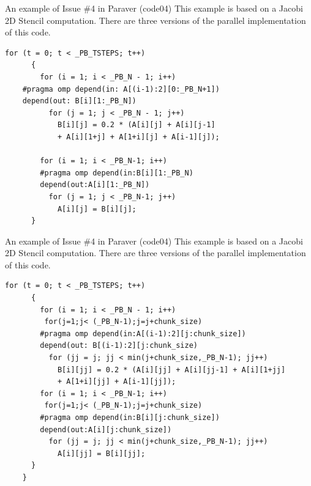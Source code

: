 \documentclass[10pt,xcolor=table]{beamer}
\begin{document}
\begin{frame}[fragile]{An example of Issue \#4 in Paraver (code04)}
This example is based on a Jacobi 2D Stencil computation. There are three versions of the parallel implementation of this code. 
  \begin{lstlisting}[style=shell,gobble=3,basicstyle=\scriptsize\ttfamily,caption={Parallelized with tasks (v1)}]
      for (t = 0; t < _PB_TSTEPS; t++)
      {
        for (i = 1; i < _PB_N - 1; i++)
    #pragma omp depend(in: A[(i-1):2][0:_PB_N+1]) 
    depend(out: B[i][1:_PB_N])   
          for (j = 1; j < _PB_N - 1; j++)
            B[i][j] = 0.2 * (A[i][j] + A[i][j-1] 
            + A[i][1+j] + A[1+i][j] + A[i-1][j]);

        for (i = 1; i < _PB_N-1; i++)
        #pragma omp depend(in:B[i][1:_PB_N) 
        depend(out:A[i][1:_PB_N])
          for (j = 1; j < _PB_N-1; j++)
            A[i][j] = B[i][j];
      }
  \end{lstlisting}
\end{frame}


\begin{frame}[fragile]{An example of Issue \#4 in Paraver (code04)}
This example is based on a Jacobi 2D Stencil computation. There are three versions of the parallel implementation of this code. 
  \begin{lstlisting}[style=shell,gobble=3,basicstyle=\scriptsize\ttfamily,caption={Parallelized with tasks (v2)}]
       for (t = 0; t < _PB_TSTEPS; t++)
      {
        for (i = 1; i < _PB_N - 1; i++)
         for(j=1;j< (_PB_N-1);j=j+chunk_size)
        #pragma omp depend(in:A[(i-1):2][j:chunk_size]) 
        depend(out: B[(i-1):2][j:chunk_size)
          for (jj = j; jj < min(j+chunk_size,_PB_N-1); jj++)
            B[i][jj] = 0.2 * (A[i][jj] + A[i][jj-1] + A[i][1+jj] 
            + A[1+i][jj] + A[i-1][jj]);
        for (i = 1; i < _PB_N-1; i++)
         for(j=1;j< (_PB_N-1);j=j+chunk_size)
        #pragma omp depend(in:B[i][j:chunk_size]) 
        depend(out:A[i][j:chunk_size])
          for (jj = j; jj < min(j+chunk_size,_PB_N-1); jj++)
            A[i][jj] = B[i][jj];
      }
    }

  \end{lstlisting}
\end{frame}
\end{document}
